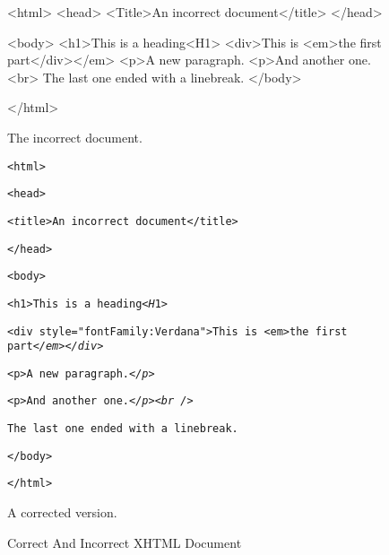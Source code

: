 \begin{figure}
\label{fig:xhtmlDocumentExample}

\begin{verbatim*}
<html>
<head>
<Title>An incorrect document</title>
</head>

<body>
<h1>This is a heading<H1>
<div>This is <em>the first part</div></em>
<p>A new paragraph.
<p>And another one.<br>
The last one ended with a linebreak.
</body>

</html>
\end{verbatim*}


The incorrect document.


\verb*-<html>-

\verb*-<head>-

\verb*-<-\emph{\texttt{t}}\verb*-itle>An incorrect document</title>-

\verb*-</head>-

\verb*-<body>-

\verb*-<h1>This is a heading<-\emph{\texttt{H}}\verb*-1>-
     
\verb*-<div style=-\emph{\texttt{"}}\verb*-fontFamily:Verdana-\emph{\texttt{"}}\verb*->This is <em>the first part-\emph{\texttt{</em></div>}}

\verb*-<p>A new paragraph.-\emph{\texttt{</p>}}

\verb*-<p>And another one.-\emph{\texttt{</p><br />}}

\verb*-The last one ended with a linebreak.-

\verb*-</body>-

\verb*-</html>-

A corrected version.

\caption{Correct And Incorrect XHTML Document}
\end{figure}

